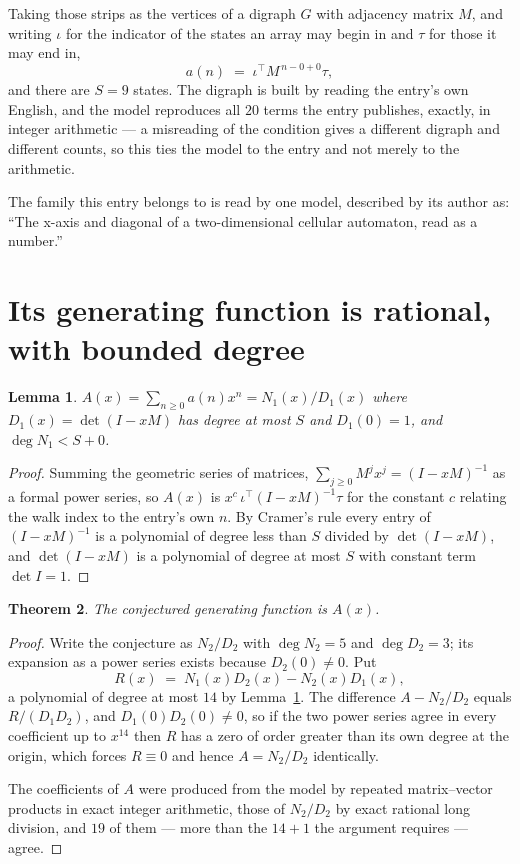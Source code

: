 \documentclass[11pt,a4paper]{article}
\theoremstyle{plain}
\newtheorem{theorem}{Theorem}
\newtheorem{lemma}[theorem]{Lemma}
\theoremstyle{definition}
\begin{document}
Taking those strips as the vertices of a digraph $G$ with adjacency matrix $M$, and writing
$\iota$ for the indicator of the states an array may begin in and $\tau$ for those it may end
in,
\[
a(n)\;=\;\iota^{\!\top}M^{\,n-0+0}\tau ,
\]
and there are $S=9$ states. The digraph is built by reading the entry's own English, and the
model reproduces all $20$ terms the entry publishes, exactly, in integer arithmetic --- a
misreading of the condition gives a different digraph and different counts, so this ties the
model to the entry and not merely to the arithmetic.

The family this entry belongs to is read by one model, described by its author as: ``The x-axis and diagonal of a two-dimensional cellular automaton, read as a number.''


\section{Its generating function is rational, with bounded degree}

\begin{lemma}\label{lem:rat}
$A(x)=\sum_{n\ge0}a(n)x^n=N_1(x)/D_1(x)$ where $D_1(x)=\det(I-xM)$ has degree at most
$S$ and $D_1(0)=1$, and $\deg N_1<S+0$.
\end{lemma}

\begin{proof}
Summing the geometric series of matrices, $\sum_{j\ge0}M^jx^j=(I-xM)^{-1}$ as a formal
power series, so $A(x)$ is $x^{c}\,\iota^{\!\top}(I-xM)^{-1}\tau$ for the constant $c$
relating the walk index to the entry's own $n$. By Cramer's rule every entry of
$(I-xM)^{-1}$ is a polynomial of degree less than $S$ divided by $\det(I-xM)$, and
$\det(I-xM)$ is a polynomial of degree at most $S$ with constant term $\det I=1$.
\end{proof}

\begin{theorem}
The conjectured generating function is $A(x)$.
\end{theorem}

\begin{proof}
Write the conjecture as $N_2/D_2$ with $\deg N_2=5$ and $\deg D_2=3$; its expansion as a
power series exists because $D_2(0)\neq0$. Put
\[
R(x)\;=\;N_1(x)D_2(x)-N_2(x)D_1(x),
\]
a polynomial of degree at most $14$ by Lemma~\ref{lem:rat}. The difference
$A-N_2/D_2$ equals $R/(D_1D_2)$, and $D_1(0)D_2(0)\neq0$, so if the two power series agree in
every coefficient up to $x^{14}$ then $R$ has a zero of order greater than its own
degree at the origin, which forces $R\equiv0$ and hence $A=N_2/D_2$ identically.

The coefficients of $A$ were produced from the model by repeated matrix--vector products in
exact integer arithmetic, those of $N_2/D_2$ by exact rational long division, and $19$
of them --- more than the $14+1$ the argument requires --- agree.
\end{proof}
\end{document}
